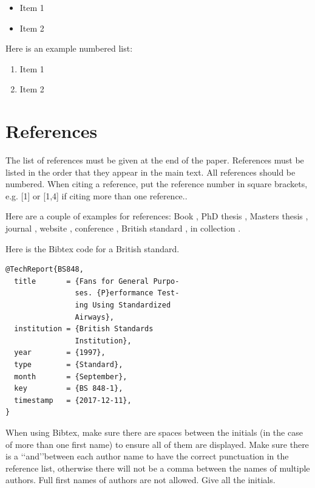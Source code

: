 \documentclass{RDJ}
\begin{document}
\begin{itemize}
	\item Item 1
	\item Item 2
\end{itemize}

Here is an example numbered list:

\begin{enumerate}
	\item Item 1
	\item Item 2
\end{enumerate}

\section{References}

The list of references must be given at the end of the paper. References must be listed in the order that they appear in the main text. All references should be numbered. When citing a reference, put the reference number in square brackets, e.g. [1] or [1,4] if citing more than one reference..

Here are a couple of examples for references: Book \cite{04KR01,08BU01,12ME01}, PhD thesis \cite{00VA01}, Masters thesis \cite{00CO01}, journal \cite{09VA01}, website \cite{knuthwebsite}, conference \cite{97GO01}, British standard \cite{BS848}, in collection \cite{00KL01}.

Here is the Bibtex code for a British standard.

\begin{lstlisting}
@TechReport{BS848,
  title       = {Fans for General Purpo-
                ses. {P}erformance Test-
                ing Using Standardized 
                Airways},
  institution = {British Standards 
                Institution},
  year        = {1997},
  type        = {Standard},
  month       = {September},
  key         = {BS 848-1},
  timestamp   = {2017-12-11},
}
\end{lstlisting}

When using Bibtex, make sure there are spaces between the initials (in the case of more than one first name) to ensure all of them are displayed. Make sure there is a \lq\lq and\rq\rq  between each author name to have the correct punctuation in the reference list, otherwise there will not be a comma between the names of multiple authors. Full first names of authors are not allowed. Give all the initials.


\end{document}
